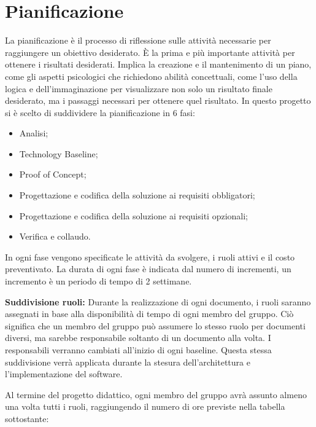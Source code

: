 \chapter{Pianificazione}
La pianificazione è il processo di riflessione sulle attività necessarie per raggiungere un obiettivo desiderato. È la prima e più importante attività per ottenere i risultati desiderati. Implica la creazione e il mantenimento di un piano, come gli aspetti psicologici che richiedono abilità concettuali, come l'uso della logica e dell'immaginazione per visualizzare non solo un risultato finale desiderato, ma i passaggi necessari per ottenere quel risultato. In questo progetto si è scelto di suddividere la pianificazione in 6 fasi: 
\begin{itemize}
    \item Analisi;
    \item Technology Baseline;
    \item Proof of Concept;
    \item Progettazione e codifica della soluzione ai requisiti obbligatori;
    \item Progettazione e codifica della soluzione ai requisiti opzionali;
    \item Verifica e collaudo.
\end{itemize}
In ogni fase vengono specificate le attività da svolgere, i ruoli attivi e il costo preventivato. La durata di ogni fase è indicata dal numero di incrementi, un incremento è un periodo di tempo di 2 settimane.

\textbf{Suddivisione ruoli:}
Durante la realizzazione di ogni documento, i ruoli saranno assegnati in base alla disponibilità di tempo di ogni membro del gruppo. Ciò significa che un membro del gruppo può assumere lo stesso ruolo per documenti diversi, ma sarebbe responsabile soltanto di un documento alla volta. I responsabili verranno cambiati all'inizio di ogni baseline. Questa stessa suddivisione verrà applicata durante la stesura dell'architettura e l'implementazione del software.

Al termine del progetto didattico, ogni membro del gruppo avrà assunto almeno una volta tutti i ruoli, raggiungendo il numero di ore previste nella tabella sottostante:

